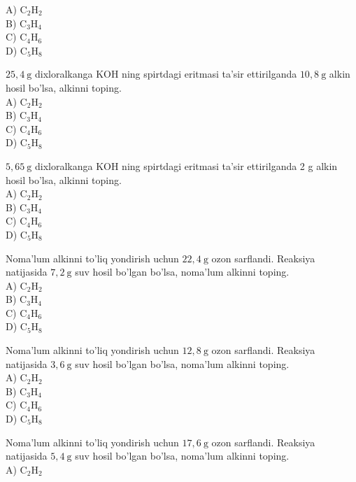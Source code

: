 A) $\mathrm{C}_{2} \mathrm{H}_{2}$\\
B) $\mathrm{C}_{3} \mathrm{H}_{4}$\\
C) $\mathrm{C}_{4} \mathrm{H}_{6}$\\
D) $\mathrm{C}_{5} \mathrm{H}_{8}$
  \item $25,4 \mathrm{~g}$ dixloralkanga KOH ning spirtdagi eritmasi ta'sir ettirilganda $10,8 \mathrm{~g}$ alkin hosil bo'lsa, alkinni toping.\\
A) $\mathrm{C}_{2} \mathrm{H}_{2}$\\
B) $\mathrm{C}_{3} \mathrm{H}_{4}$\\
C) $\mathrm{C}_{4} \mathrm{H}_{6}$\\
D) $\mathrm{C}_{5} \mathrm{H}_{8}$
  \item $5,65 \mathrm{~g}$ dixloralkanga KOH ning spirtdagi eritmasi ta'sir ettirilganda 2 g alkin hosil bo'lsa, alkinni toping.\\
A) $\mathrm{C}_{2} \mathrm{H}_{2}$\\
B) $\mathrm{C}_{3} \mathrm{H}_{4}$\\
C) $\mathrm{C}_{4} \mathrm{H}_{6}$\\
D) $\mathrm{C}_{5} \mathrm{H}_{8}$
  \item Noma'lum alkinni to'liq yondirish uchun $22,4 \mathrm{~g}$ ozon sarflandi. Reaksiya natijasida $7,2 \mathrm{~g}$ suv hosil bo'lgan bo'lsa, noma'lum alkinni toping.\\
A) $\mathrm{C}_{2} \mathrm{H}_{2}$\\
B) $\mathrm{C}_{3} \mathrm{H}_{4}$\\
C) $\mathrm{C}_{4} \mathrm{H}_{6}$\\
D) $\mathrm{C}_{5} \mathrm{H}_{8}$
  \item Noma'lum alkinni to'liq yondirish uchun $12,8 \mathrm{~g}$ ozon sarflandi. Reaksiya natijasida $3,6 \mathrm{~g}$ suv hosil bo'lgan bo'lsa, noma'lum alkinni toping.\\
A) $\mathrm{C}_{2} \mathrm{H}_{2}$\\
B) $\mathrm{C}_{3} \mathrm{H}_{4}$\\
C) $\mathrm{C}_{4} \mathrm{H}_{6}$\\
D) $\mathrm{C}_{5} \mathrm{H}_{8}$
  \item Noma'lum alkinni to'liq yondirish uchun $17,6 \mathrm{~g}$ ozon sarflandi. Reaksiya natijasida $5,4 \mathrm{~g}$ suv hosil bo'lgan bo'lsa, noma'lum alkinni toping.\\
A) $\mathrm{C}_{2} \mathrm{H}_{2}$\\
